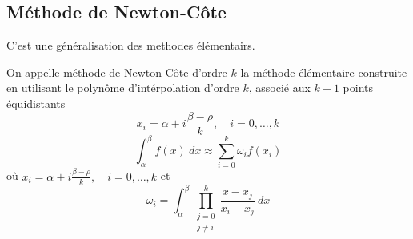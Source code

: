 \subsection{Méthode de Newton-Côte}
C'est une généralisation des methodes élémentairs.

\begin{definition}
    On appelle méthode de Newton-Côte d'ordre $k$ la méthode élémentaire construite en utilisant le polynôme d'intérpolation d'ordre  $k$, associé aux $k+1$ points équidistants  
    \[
    x_i = \alpha + i \frac{\beta - \rho}{k}, \quad i = 0, \ldots, k
    \] 
    \[
    \int_{{\alpha}}^{{\beta}} {f(x)} \: d{x} \approx \sum_{i=0}^{k} \omega_if(x_i)
    \] 
    où $x_i = \alpha + i \frac{\beta - \rho}{k}, \quad i = 0, \ldots, k$ et 
    \[
        \omega_i = \int_{{\alpha}}^{{\beta}} {\prod_{\substack{j = 0 \\ j\neq i}}^{k} \frac{x - x_j}{x_i - x_j} } \: d{x} {}
    \] 
\end{definition}

